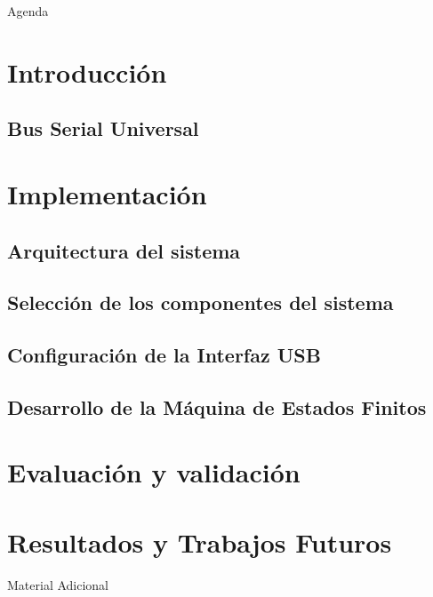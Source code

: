 \documentclass[11pt,a4paper,xcolor={table}]{beamer}
\begin{document}
	\titlepage
		
		
	\begin{frame}{Agenda}
		\tableofcontents[]
	\end{frame}
	\section{Introducción}
		\subsection{Bus Serial Universal}
			
	\section{Implementación}
		\subsection{Arquitectura del sistema}
			
		\subsection{Selección de los componentes del sistema}
			
		\subsection{Configuración de la Interfaz USB}
			
		\subsection{Desarrollo de la Máquina de Estados Finitos}
			
	\section{Evaluación y validación}
			
			
			
	\section{Resultados y Trabajos Futuros}
		
					
			\begin{frame}{Material Adicional}
			\end{frame}
			\scriptsize{}
\end{document}
